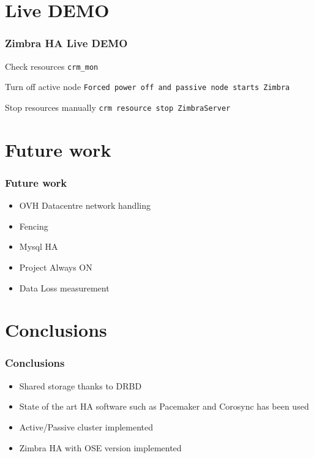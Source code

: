\documentclass[10pt]{beamer}
\begin{document}
\section {Live DEMO}

\begin{frame}

\frametitle{Zimbra HA Live DEMO}


\begin{center}
    \begin{block}{Check resources}
{\tt crm\_mon}
    \end{block}
    \begin{block}{Turn off active node}
{\tt Forced power off and passive node starts Zimbra}
    \end{block}
    \begin{block}{Stop resources manually}
{\tt crm resource stop ZimbraServer}
    \end{block}
    

\end{center}




\end{frame}
\section {Future work}

\begin{frame}
\frametitle{Future work}

\begin{itemize}
  \item OVH Datacentre network handling
  \item Fencing
  \item Mysql HA
  \item Project Always ON
  \item Data Loss measurement
\end{itemize}
\end{frame}
\section {Conclusions}
\begin{frame}

\frametitle{Conclusions}

\begin{center}
  \begin{itemize}
    \item Shared storage thanks to DRBD
    \item State of the art HA software such as Pacemaker and Corosync has been used
    \item Active/Passive cluster implemented
    \item Zimbra HA with OSE version implemented
  \end{itemize}
\end{center}

\end{frame}
\end{document}

